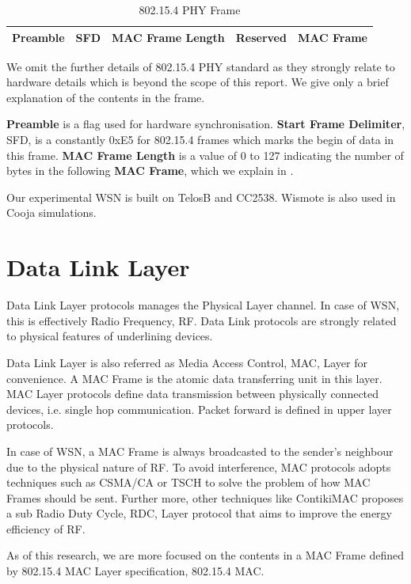 \begin{table}[th!]
	\centering
	\begin{tabular}{|c|c|c|c|c|}
		\hline
		Preamble & SFD & MAC Frame Length & Reserved & MAC Frame\\ \hline
	\end{tabular}
	\caption{802.15.4 PHY Frame}
	\label{Fig: 802.15.4 PHY Frame}
\end{table}

We omit the further details of 802.15.4 PHY standard as they strongly relate to hardware details which is beyond the scope of this report. We give only a brief explanation of the contents in the frame.

\textbf{Preamble} is a flag used for hardware synchronisation. \textbf{Start Frame Delimiter}, SFD, is a constantly 0xE5 for 802.15.4 frames which marks the begin of data in this frame. \textbf{MAC Frame Length} is a value of 0 to 127 indicating the number of bytes in the following \textbf{MAC Frame}, which we explain in .

Our experimental WSN is built on TelosB\cite{TelosB} and CC2538\cite{CC2538}. Wismote\cite{Wismote} is also used in Cooja simulations.

\section{Data Link Layer} \label{Sec: Data Link Layer}
Data Link Layer protocols manages the Physical Layer channel. In case of WSN, this is effectively Radio Frequency, RF. Data Link protocols are strongly related to physical features of underlining devices. 

Data Link Layer is  also referred as Media Access Control, MAC, Layer for convenience. A MAC Frame is the atomic data transferring unit in this layer. MAC Layer protocols define data transmission between physically connected devices, i.e. single hop communication. Packet forward is defined in upper layer protocols.

In case of WSN, a MAC Frame is always broadcasted to the sender’s neighbour due to the physical nature of RF. To avoid interference, MAC protocols adopts  techniques such as CSMA/CA \cite{802154} or TSCH\cite{TSCH} to solve the problem of how MAC Frames should be sent. Further more, other techniques like ContikiMAC\cite{ContikiMAC} proposes a sub Radio Duty Cycle, RDC, Layer protocol that aims to improve the energy efficiency of RF.

As of this research, we are more focused on the contents in a MAC Frame defined by 802.15.4 MAC Layer specification\cite{802154}, 802.15.4 MAC.


